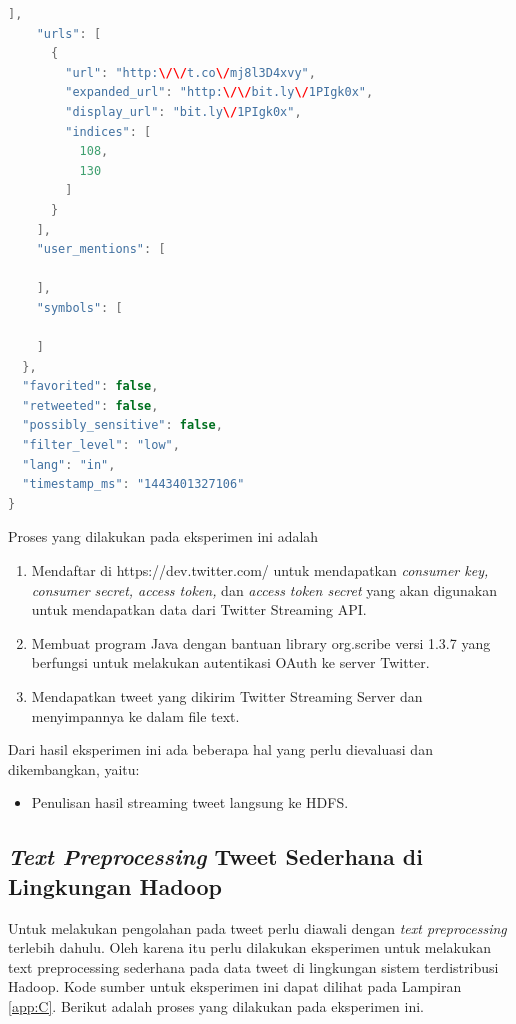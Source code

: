 \begin{lstlisting}[language=Java,basicstyle=\tiny,caption=Hasil Streaming]
    ],
    "urls": [
      {
        "url": "http:\/\/t.co\/mj8l3D4xvy",
        "expanded_url": "http:\/\/bit.ly\/1PIgk0x",
        "display_url": "bit.ly\/1PIgk0x",
        "indices": [
          108,
          130
        ]
      }
    ],
    "user_mentions": [
      
    ],
    "symbols": [
      
    ]
  },
  "favorited": false,
  "retweeted": false,
  "possibly_sensitive": false,
  "filter_level": "low",
  "lang": "in",
  "timestamp_ms": "1443401327106"
}
\end{lstlisting}

Proses yang dilakukan pada eksperimen ini adalah
\begin{enumerate}
	\item Mendaftar di https://dev.twitter.com/ untuk mendapatkan \textit{consumer key,  consumer secret, access token,} dan \textit{access token secret} yang akan digunakan untuk mendapatkan data dari Twitter Streaming API.
	\item Membuat program Java dengan bantuan library org.scribe versi 1.3.7 yang berfungsi untuk melakukan autentikasi OAuth ke server Twitter.
	\item Mendapatkan tweet yang dikirim Twitter Streaming Server dan menyimpannya ke dalam file text.
\end{enumerate}
 
Dari hasil eksperimen ini ada beberapa hal yang perlu dievaluasi dan dikembangkan, yaitu:

\begin{itemize}
	\item Penulisan hasil streaming tweet langsung ke HDFS.
\end{itemize}


\subsection{\textit{Text Preprocessing} Tweet Sederhana di Lingkungan Hadoop}
Untuk melakukan pengolahan pada tweet perlu diawali dengan \textit{text preprocessing} terlebih dahulu. Oleh karena itu perlu dilakukan eksperimen untuk melakukan text preprocessing sederhana pada data tweet di lingkungan sistem terdistribusi Hadoop. Kode sumber untuk eksperimen ini dapat dilihat pada Lampiran \ref{app:C}. Berikut adalah proses yang dilakukan pada eksperimen ini.

